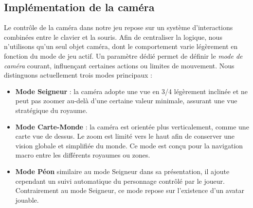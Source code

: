 \subsection{Implémentation de la caméra}

Le contrôle de la caméra dans notre jeu repose sur un système d’interactions combinées entre le clavier et la souris. Afin de centraliser la logique, nous n’utilisons qu’un seul objet caméra, dont le comportement varie légèrement en fonction du mode de jeu actif. Un paramètre dédié permet de définir le \textit{mode de caméra} courant, influençant certaines actions ou limites de mouvement. Nous distinguons actuellement trois modes principaux :


\begin{itemize}
    \item \textbf{Mode Seigneur} : la caméra adopte une vue en 3/4 légèrement inclinée et ne peut pas zoomer au-delà d’une certaine valeur minimale, assurant une vue stratégique du royaume.
    
    \item \textbf{Mode Carte-Monde} : la caméra est orientée plus verticalement, comme une carte vue de dessus. Le zoom est limité vers le haut afin de conserver une vision globale et simplifiée du monde. Ce mode est conçu pour la navigation macro entre les différents royaumes ou zones.

    \item \textbf{Mode Péon} similaire au mode Seigneur dans sa présentation, il ajoute cependant un suivi automatique du personnage contrôlé par le joueur. Contrairement au mode Seigneur, ce mode repose sur l’existence d’un avatar jouable.
\end{itemize}

